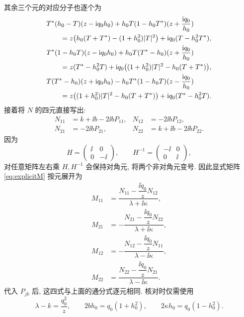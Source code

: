 其余三个元的对应分子也逐个为
\begin{equation*}
\begin{aligned}
&{T}^{*}(h_0-T)(z-\mathrm{i} q_0h_0)
+h_0T(1-h_0{T}^{*})(z+\dfrac{\mathrm{i} q_0}{h_0})\\
&\qquad=z\bigl(h_0(T+{T}^{*})-(1+h_0^2)|T|^2\bigr)
+\mathrm{i} q_0(T-h_0^2{T}^{*}),\\
&{T}^{*}(1-h_0T)(z-\mathrm{i} q_0h_0)
+h_0T({T}^{*}-h_0)(z+\dfrac{\mathrm{i} q_0}{h_0})\\
&\qquad=z({T}^{*}-h_0^2T)
+\mathrm{i} q_0\bigl((1+h_0^2)|T|^2-h_0(T+{T}^{*})\bigr),\\
&T({T}^{*}-h_0)(z+\mathrm{i} q_0h_0)
-h_0{T}^{*}(1-h_0T)(z-\dfrac{\mathrm{i} q_0}{h_0})\\
&\qquad=z\bigl((1+h_0^2)|T|^2-h_0(T+{T}^{*})\bigr)
+\mathrm{i} q_0({T}^{*}-h_0^2T).
\end{aligned}
\end{equation*}
接着将 $N$ 的四元直接写出:
\begin{equation*}
\begin{aligned}
N_{11}&=k+\ii b-2\ii bP_{11},&
N_{12}&=-2\ii bP_{12},\\
N_{21}&=-2\ii bP_{21},&
N_{22}&=k+\ii b-2\ii bP_{22}.
\end{aligned}
\end{equation*}
因为
\begin{equation*}
H=\begin{pmatrix}\ii&0\\0&-\ii\end{pmatrix},\qquad
H^{-1}=\begin{pmatrix}-\ii&0\\0&\ii\end{pmatrix},
\end{equation*}
对任意矩阵左右乘 $H,H^{-1}$ 会保持对角元, 将两个非对角元变号.
因此显式矩阵 \eqref{eq:explicitM} 按元展开为
\begin{equation*}
\begin{aligned}
M_{11}
&=\dfrac{N_{11}-\dfrac{\ii q_0}{z}N_{12}}{\lambda+\ii\kappa},\\
M_{21}
&=-\dfrac{N_{21}-\dfrac{\ii q_0}{z}N_{22}}{\lambda+\ii\kappa},\\
M_{12}
&=-\dfrac{N_{12}-\dfrac{\ii q_0}{z}N_{11}}{\lambda-\ii\kappa},\\
M_{22}
&=\dfrac{N_{22}-\dfrac{\ii q_0}{z}N_{21}}{\lambda-\ii\kappa}.
\end{aligned}
\end{equation*}
代入 $P_{jk}$ 后, 这四式与上面的通分式逐元相同.
核对时仅需使用
\begin{equation*}
\lambda-k=\dfrac{q_0^2}{z},\qquad
2bh_0=q_0(1+h_0^2),\qquad
2\kappa h_0=q_0(1-h_0^2).
\end{equation*}
